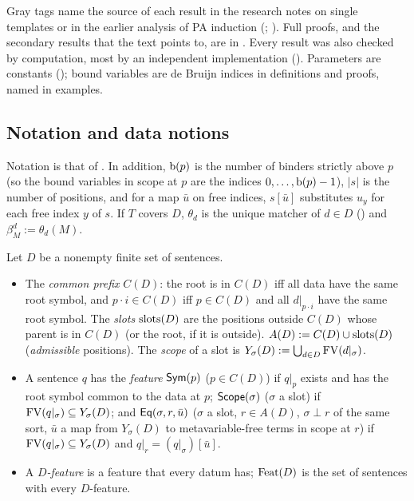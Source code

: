 Gray tags name the source of each result in the research notes on single templates or in the earlier analysis of PA induction (; ). Full proofs, and the secondary results that the text points to, are in . Every result was also checked by computation, most by an independent implementation (). Parameters are constants (); bound variables are de Bruijn indices in definitions and proofs, named in examples.

\subsection{Notation and data notions}\label{sec:single:prelim}

Notation is that of . In addition, $\mathrm{b}(p)$ is the number of binders strictly above $p$ (so the bound variables in scope at $p$ are the indices $0,\dots,\mathrm{b}(p)-1$), $|s|$ is the number of positions, and for a map $\bar u$ on free indices, $s[\bar u]$ substitutes $u_y$ for each free index $y$ of $s$. If $T$ covers $D$, $\theta_d$ is the unique matcher of $d\in D$ () and $\beta^d_M:=\theta_d(M)$.

\begin{definition}\label{def:single:features}
Let $D$ be a nonempty finite set of sentences.
\begin{itemize}
\item The \emph{common prefix} $C(D)$: the root is in $C(D)$ iff all data have the same root symbol, and $p\cdot i\in C(D)$ iff $p\in C(D)$ and all $d|_{p\cdot i}$ have the same root symbol. The \emph{slots} $\mathrm{slots}(D)$ are the positions outside $C(D)$ whose parent is in $C(D)$ (or the root, if it is outside). $A(D):=C(D)\cup\mathrm{slots}(D)$ (\emph{admissible} positions). The \emph{scope} of a slot is $Y_\sigma(D):=\bigcup_{d\in D}\mathrm{FV}(d|_\sigma)$.
\item A sentence $q$ has the \emph{feature} $\mathsf{Sym}(p)$ ($p\in C(D)$) if $q|_p$ exists and has the root symbol common to the data at $p$; $\mathsf{Scope}(\sigma)$ ($\sigma$ a slot) if $\mathrm{FV}(q|_\sigma)\subseteq Y_\sigma(D)$; and $\mathsf{Eq}(\sigma,r,\bar u)$ ($\sigma$ a slot, $r\in A(D)$, $\sigma\perp r$ of the same sort, $\bar u$ a map from $Y_\sigma(D)$ to metavariable-free terms in scope at $r$) if $\mathrm{FV}(q|_\sigma)\subseteq Y_\sigma(D)$ and $q|_r=(q|_\sigma)[\bar u]$.
\item A \emph{$D$-feature} is a feature that every datum has; $\mathrm{Feat}(D)$ is the set of sentences with every $D$-feature.
\end{itemize}
\end{definition}

